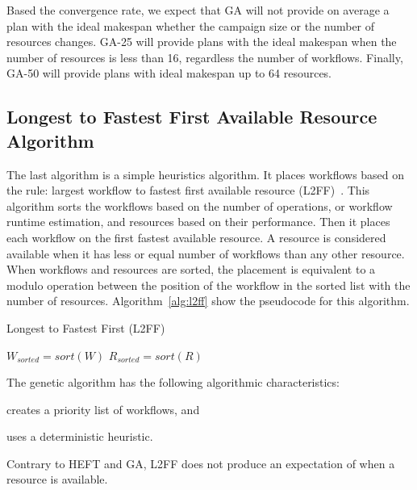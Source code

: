 Based the convergence rate, we expect that GA will not provide on average a
plan with the ideal makespan whether the campaign size or the number of
resources changes. GA-25 will provide plans with the ideal makespan when the
number of resources is less than 16, regardless the number of workflows.
Finally, GA-50 will provide plans with ideal makespan up to 64 resources.


\subsection{Longest to Fastest First Available Resource Algorithm}
\label{algo:l2ff}
The last algorithm is a simple heuristics algorithm. It places workflows based
on the rule: largest workflow to fastest first available resource
(L2FF)~\cite{balasubramanian2019programming}. This algorithm sorts the
workflows based on the number of operations, or workflow runtime estimation,
and resources based on their performance. Then it places each workflow on the
first fastest available resource. A resource is considered available when it
has less or equal number of workflows than any other resource. When workflows
and resources are sorted, the placement is equivalent to a modulo operation
between the position of the workflow in the sorted list with the number of
resources. Algorithm~\ref{alg:l2ff} show the pseudocode for this algorithm.

\begin{algorithm}[ht]
    \caption{Longest to Fastest First (L2FF)}
    \label{alg:l2ff}
    \begin{algorithmic}[1]
        \State \texttt{$W_{sorted}=sort(W)$}
        \State \texttt{$R_{sorted}=sort(R)$}
        \EndFor
        \EndProcedure
    \end{algorithmic}
\end{algorithm}

The genetic algorithm has the following algorithmic characteristics:
\begin{inparaenum}[1)]
    \item creates a priority list of workflows, and
    \item uses a deterministic heuristic.
\end{inparaenum}
Contrary to HEFT and GA, L2FF does not produce an expectation of when a
resource is available.

